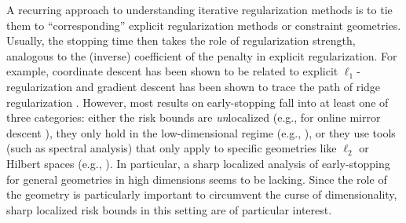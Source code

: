 \documentclass[a4paper]{article}
\theoremstyle{thmstyle}
\theoremstyle{defstyle}
\theoremstyle{remark}
\begin{document}
A recurring approach to understanding iterative regularization methods is to tie them to ``corresponding'' explicit regularization methods or constraint geometries.
Usually, the stopping time then takes the role of regularization strength, analogous to the (inverse) coefficient of the penalty in explicit regularization. 
For example, coordinate descent has been shown to be related to explicit $\ell_1$-regularization  \citep{Hastie2001statisticallearning, Efron2004Least, Rosset2004boosting, Zhang2005boosting} and gradient descent has been shown to trace the path of ridge regularization \citep{Bauer2007regularization,Ali2019continuous}. 
However, most results on early-stopping fall into at least one of three categories: either the risk bounds are \emph{un}localized (e.g., for online mirror descent \citep{Shalev2007online,bach2024learning}), they only hold in the low-dimensional regime (e.g., \citet{Suggala2018connecting}), or they use tools (such as spectral analysis) that only apply to specific geometries like $\ell_2$ or Hilbert spaces (e.g., \citet{Wei2018early,Ali2019continuous,Yao2007}).
In particular, a sharp localized analysis of early-stopping for general geometries in high dimensions seems to be lacking.
Since the role of the geometry is particularly important to circumvent the curse of dimensionality, sharp localized risk bounds in this setting are of particular interest.
\end{document}
